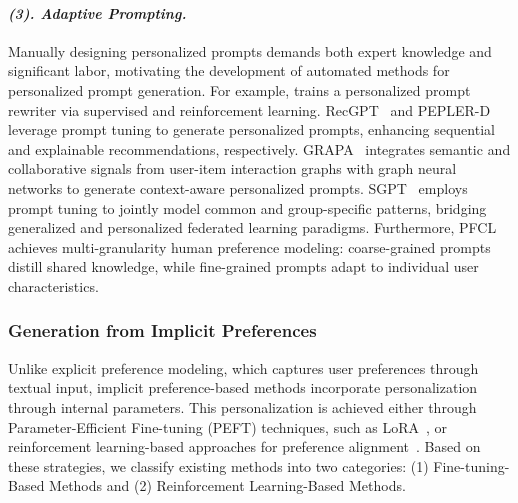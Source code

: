 \paragraph{\textbf{\textit{{(3). Adaptive Prompting.}}}}
Manually designing personalized prompts demands both expert knowledge and significant labor, motivating the development of automated methods for personalized prompt generation. For example, \citet{li2024learning} trains a personalized prompt rewriter via supervised and reinforcement learning. RecGPT~\cite{zhang2024recgpt} and PEPLER-D~\cite{li2023personalized} leverage prompt tuning to generate personalized prompts, enhancing sequential and explainable recommendations, respectively. GRAPA~\cite{qu2024graph} integrates semantic and collaborative signals from user-item interaction graphs with graph neural networks to generate context-aware personalized prompts. SGPT~\cite{deng2024unlocking} employs prompt tuning
to jointly model common and group-specific patterns, bridging generalized and personalized federated learning paradigms. Furthermore, PFCL~\cite{yu2024personalized} achieves multi-granularity human preference modeling: coarse-grained prompts distill shared knowledge, while fine-grained prompts adapt to individual user characteristics.

\subsubsection{\textbf{Generation from Implicit Preferences}}
Unlike explicit preference modeling, which captures user preferences through textual input, implicit preference-based methods incorporate personalization through internal parameters. This personalization is achieved either through Parameter-Efficient Fine-tuning (PEFT) techniques, such as LoRA~\cite{hu2022lora}, or reinforcement learning-based approaches for preference alignment~\cite{li2024learning,chen2024pad}. Based on these strategies, we classify existing methods into two categories: (1) Fine-tuning-Based Methods and (2) Reinforcement Learning-Based Methods.


